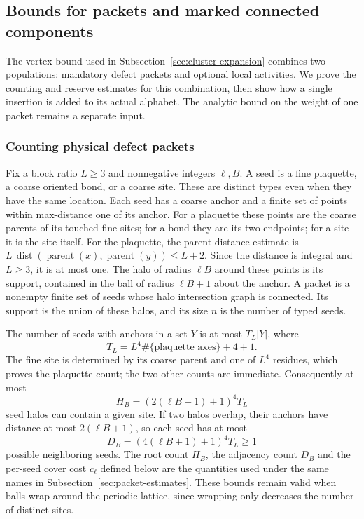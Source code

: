 \subsection{Bounds for packets and marked connected components}
\label{sec:mixed-activity-prices}
The vertex bound used in Subsection~\ref{sec:cluster-expansion} combines
two populations: mandatory defect packets and optional local activities.
We prove the counting and reserve estimates for this combination, then
show how a single insertion is added to its actual alphabet. The analytic
bound on the weight of one packet remains a separate input.

\subsubsection{Counting physical defect packets}
Fix a block ratio $L\ge3$ and nonnegative integers $\ell,B$. A seed is a fine plaquette, a coarse
oriented bond, or a coarse site. These are distinct types even when
they have the same location. Each seed has a coarse anchor and a
finite set of points within max-distance one of its anchor. For a
plaquette these points are the coarse parents of its touched fine
sites; for a bond they are its two endpoints; for a site it is the
site itself. For the plaquette, the parent-distance estimate is
$L\,\operatorname{dist}(\operatorname{parent}(x),\operatorname{parent}(y))\le L+2$.
Since the distance is integral and $L\ge3$, it is at most one. The halo of radius $\ell B$ around these points is its
support, contained in the ball of radius $\ell B+1$ about the anchor.
A packet is a nonempty finite set of seeds whose halo intersection
graph is connected. Its support is the union of these halos, and
its size $n$ is the number of typed seeds.

The number of seeds with anchors in a set $Y$ is at most $T_L|Y|$,
where
\[
        T_L=L^4\#\{\text{plaquette axes}\}+4+1.
\]
The fine site is determined by its coarse parent and one of $L^4$
residues, which proves the plaquette count; the two other counts are
immediate. Consequently at most
\[
 H_B=(2(\ell B+1)+1)^4T_L
\]
seed halos can contain a given site. If two halos overlap, their
anchors have distance at most $2(\ell B+1)$, so each seed has at most
\[
                   D_B=(4(\ell B+1)+1)^4T_L\ge1
\]
possible neighboring seeds. The root count $H_B$, the adjacency count
$D_B$ and the per-seed cover cost $c_\ell$ defined below are the
quantities used under the same names in
Subsection~\ref{sec:packet-estimates}. These bounds remain valid when balls wrap
around the periodic lattice, since wrapping only decreases the number
of distinct sites.

